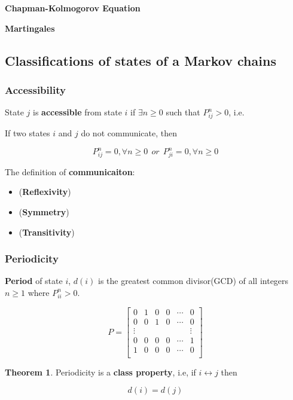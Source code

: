 \documentclass[12pt]{article}
\theoremstyle{nonumberbreak}
\begin{document}
\textbf{Chapman-Kolmogorov Equation}



\textbf{Martingales}





\subsection{Classifications of states of a Markov chains}


\subsubsection{Accessibility}

State $j$ is \textbf{accessible} from state $i$ if $\exists n \ge 0$ such that $P^n_{ij} > 0$, i.e. 

If two states $i$ and $j$ do not communicate, then 

$$
P^n_{ij} = 0, \forall n \ge 0 \ \ or \ \ P^n_{ji} = 0, \forall n \ge 0 
$$

The definition of \textbf{communicaiton}: 

\begin{itemize}
	\item (\textbf{Reflexivity})
	\item (\textbf{Symmetry})
	\item (\textbf{Transitivity})
\end{itemize}



\subsubsection{Periodicity}

\textbf{Period} of state $i$, $d(i)$ is the greatest common divisor(GCD) of all integers $n \ge 1$ where $P^n_{ii} > 0$. 

$$
P = \begin{bmatrix}
0 & 1 & 0 & 0 & \cdots & 0 \\
0 & 0 & 1 & 0 & \cdots & 0 \\
\vdots &  &  &  &  & \vdots \\
0 & 0 & 0 & 0 & \cdots & 1 \\
1 & 0 & 0 & 0 & \cdots & 0 \\
\end{bmatrix}
$$


\begin{theorem}
\textbf{Theorem 1}. Periodicity is a \textbf{class property}, i.e, if $i \leftrightarrow j$ then

$$
d(i) = d(j)
$$
\end{theorem}
\end{document}
